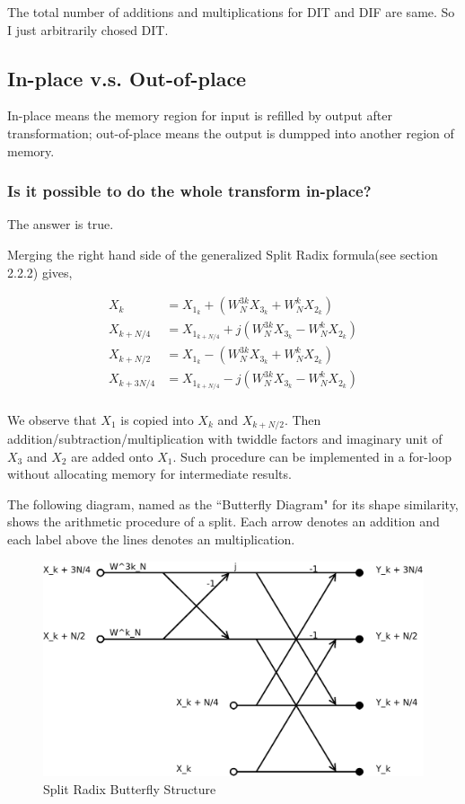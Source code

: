 \documentclass[a4paper]{report}
\begin{document}
	The total number of additions and multiplications for DIT and DIF are same. So I just arbitrarily chosed DIT.

\subsection{In-place v.s. Out-of-place} \indent

	In-place means the memory region for input is refilled by output after transformation; out-of-place means the output is dumpped into another region of memory.
	
\subsubsection{Is it possible to do the whole transform in-place?} \indent

	The answer is true.
	
	\bigskip
	
	Merging the right hand side of the generalized Split Radix formula(see section 2.2.2) gives,
	
	\[\begin{split}
  X_k 		  & = X_{1_k} + \left(W_N^{3k} X_{3_k} + W_N^k X_{2_k}\right)\\
  X_{k + N/4}  & = X_{1_{k + N/4}} + j\left(W_N^{3k} X_{3_k} - W_N^k X_{2_k}\right) \\
  X_{k + N/2}  & = X_{1_k} - \left(W_N^{3k} X_{3_k} + W_N^k X_{2_k}\right) \\
  X_{k + 3N/4} & = X_{1_{k + N/4}} - j\left(W_N^{3k} X_{3_k} - W_N^k X_{2_k}\right) \\
	\end{split}\]
	
	We observe that $X_1$ is copied into $X_k$ and $X_{k + N/2}$. Then addition/subtraction/multiplication with twiddle factors and imaginary unit of $X_3$ and $X_2$ are added onto $X_1$. Such procedure can be implemented in a for-loop without allocating memory for intermediate results.
	
	The following diagram, named as the ``Butterfly Diagram" for its shape similarity, shows the arithmetic procedure of a split. Each arrow denotes an addition and each label above the lines denotes an multiplication.
	
	\begin{figure}[htp]
		\centering
		\includegraphics[scale=0.13]{../dia/split-butterfly.png}
		\caption{Split Radix Butterfly Structure}
	\end{figure}
\end{document}
